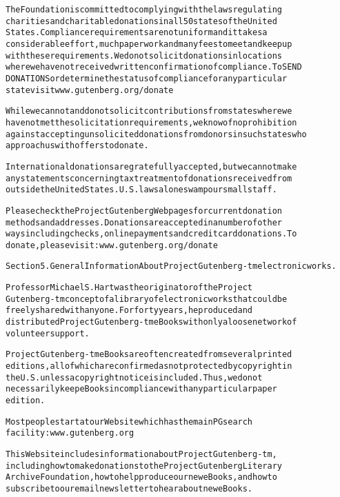 \documentclass[12pt]{book}[2005/09/16]
\newenvironment{PGtext}{%
\begin{alltt}
%****
\fontsize{8.1}{10}\ttfamily\selectfont}%
{\end{alltt}}
\begin{document}
\begin{PGtext}
The Foundation is committed to complying with the laws regulating
charities and charitable donations in all 50 states of the United
States. Compliance requirements are not uniform and it takes a
considerable effort, much paperwork and many fees to meet and keep up
with these requirements. We do not solicit donations in locations
where we have not received written confirmation of compliance. To SEND
DONATIONS or determine the status of compliance for any particular
state visit www.gutenberg.org/donate

While we cannot and do not solicit contributions from states where we
have not met the solicitation requirements, we know of no prohibition
against accepting unsolicited donations from donors in such states who
approach us with offers to donate.

International donations are gratefully accepted, but we cannot make
any statements concerning tax treatment of donations received from
outside the United States. U.S. laws alone swamp our small staff.

Please check the Project Gutenberg Web pages for current donation
methods and addresses. Donations are accepted in a number of other
ways including checks, online payments and credit card donations. To
donate, please visit: www.gutenberg.org/donate

Section 5. General Information About Project Gutenberg-tm electronic works.

Professor Michael S. Hart was the originator of the Project
Gutenberg-tm concept of a library of electronic works that could be
freely shared with anyone. For forty years, he produced and
distributed Project Gutenberg-tm eBooks with only a loose network of
volunteer support.

Project Gutenberg-tm eBooks are often created from several printed
editions, all of which are confirmed as not protected by copyright in
the U.S. unless a copyright notice is included. Thus, we do not
necessarily keep eBooks in compliance with any particular paper
edition.

Most people start at our Web site which has the main PG search
facility: www.gutenberg.org

This Web site includes information about Project Gutenberg-tm,
including how to make donations to the Project Gutenberg Literary
Archive Foundation, how to help produce our new eBooks, and how to
subscribe to our email newsletter to hear about new eBooks.
\end{PGtext}
\end{document}
